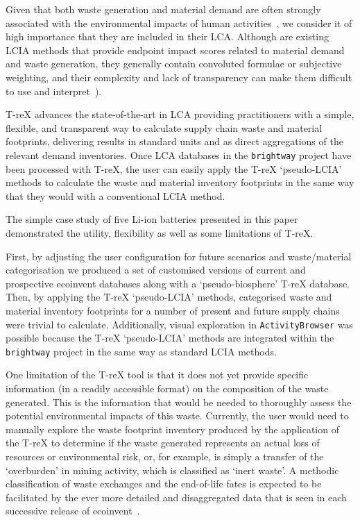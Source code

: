 Given that both waste generation and material demand are often strongly associated with the environmental impacts of human activities~\citep{laurenti2023wastefootprint,steinmann2017resourcefootprints}, we consider it of high importance that they are included in their LCA. Although are existing LCIA methods that provide endpoint impact scores related to material demand and waste generation, they generally contain convoluted formulae or subjective weighting, and their complexity and lack of transparency can make them difficult to use and interpret~\citep{foen2021ecofactors,hauschild2003edip,cen2019en15804, arvidsson2020csi,foen2021ecofactors}).

T-reX advances the state-of-the-art in LCA providing practitioners with a simple, flexible, and transparent way to calculate supply chain waste and material footprints, delivering results in standard units and as direct aggregations of the relevant demand inventories. Once LCA databases in the \texttt{brightway} project have been processed with T-reX, the user can easily apply the T-reX `pseudo-LCIA' methods to calculate the waste and material inventory footprints in the same way that they would with a conventional LCIA method.

The simple case study of five Li-ion batteries presented in this paper demonstrated the  utility, flexibility as well as some limitations of T-reX.

First, by adjusting the user configuration for future scenarios and waste/material categorisation we produced a set of customised versions of current and prospective ecoinvent databases along with a `pseudo-biosphere' T-reX database. Then, by applying the T-reX `pseudo-LCIA' methods, categorised waste and material inventory footprints for a number of present and future supply chains were trivial to calculate. Additionally, visual exploration in \texttt{ActivityBrowser} was possible because the T-reX `pseudo-LCIA' methods are integrated within the \texttt{brightway} project in the same way as standard LCIA methods.

One limitation of the T-reX tool is that it does not yet provide specific information (in a readily accessible format) on the composition of the waste generated. This is the information that would be needed to thoroughly assess the potential environmental impacts of this waste. Currently, the user would need to manually explore the waste footprint inventory produced by the application of the T-reX to determine if the waste generated represents an actual loss of resources or environmental risk, or, for example, is simply a transfer of the `overburden' in mining activity, which is classified as `inert waste'. A methodic classification of waste exchanges and the end-of-life fates is expected to be facilitated by the ever more detailed and disaggregated data that is seen in each successive release of ecoinvent~\citep{fitzgerald2023ecoinventdocumentation}.


